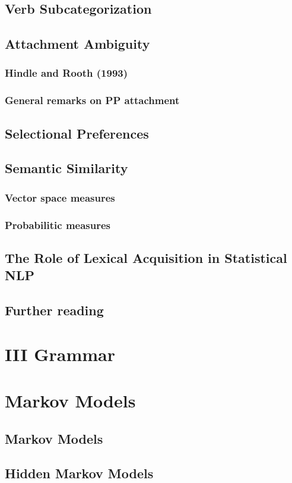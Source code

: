 \documentclass[a4paper]{article}
\begin{document}
\subsection{Verb Subcategorization}
\subsection{Attachment Ambiguity}
\subsubsection{Hindle and Rooth (1993)}
\subsubsection{General remarks on PP attachment}
\subsection{Selectional Preferences}
\subsection{Semantic Similarity}
\subsubsection{Vector space measures}
\subsubsection{Probabilitic measures}
\subsection{The Role of Lexical Acquisition in Statistical NLP}
\subsection{Further reading}
\newpage
\section*{III Grammar}
\section{Markov Models}
\subsection{Markov Models}
\subsection{Hidden Markov Models}
\end{document}
